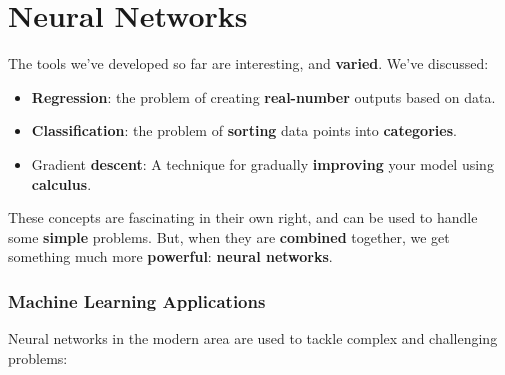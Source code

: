 \setcounter{chapter}{6}

\chapter{Neural Networks}

    The tools we've developed so far are interesting, and \textbf{varied}. We've discussed:
    
    \begin{itemize}
        \item \textbf{Regression}: the problem of creating \textbf{real-number} outputs based on data.
        \item \textbf{Classification}: the problem of \textbf{sorting} data points into \textbf{categories}.
        \item Gradient \textbf{descent}: A technique for gradually \textbf{improving} your model using \textbf{calculus}.
    \end{itemize}
    
    These concepts are fascinating in their own right, and can be used to handle some \textbf{simple} problems. But, when they are \textbf{combined} together, we get something much more \textbf{powerful}: \textbf{neural networks}.
    
    \subsection{Machine Learning Applications}
            
        Neural networks in the modern area are used to tackle complex and challenging problems:
        
